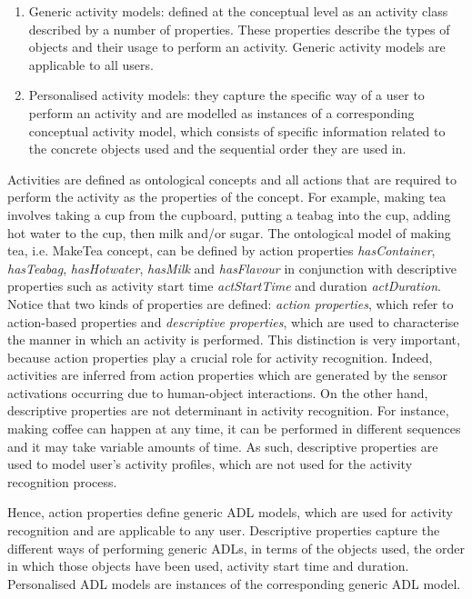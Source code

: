 \begin{enumerate}
 \item Generic activity models: defined at the conceptual level as an activity class described by a number of properties. These properties describe the types of objects and their usage to perform an activity. Generic activity models are applicable to all users.
 \item Personalised activity models: they capture the specific way of a user to perform an activity and are modelled as instances of a corresponding conceptual activity model, which consists of specific information related to the concrete objects used and the sequential order they are used in.
\end{enumerate}

Activities are defined as ontological concepts and all actions that are required to perform the activity as the properties of the concept. For example, making tea involves taking a cup from the cupboard, putting a teabag into the cup, adding hot water to the cup, then milk and/or sugar. The ontological model of making tea, i.e. MakeTea concept, can be defined by action properties \textit{hasContainer}, \textit{hasTeabag}, \textit{hasHotwater}, \textit{hasMilk} and \textit{hasFlavour} in conjunction with descriptive properties such as activity start time \textit{actStartTime} and duration \textit{actDuration}. Notice that two kinds of properties are defined: \textit{action properties}, which refer to action-based properties and \textit{descriptive properties}, which are used to characterise the manner in which an activity is performed. This distinction is very important, because action properties play a crucial role for activity recognition. Indeed, activities are inferred from action properties which are generated by the sensor activations occurring due to human-object interactions. On the other hand, descriptive properties are not determinant in activity recognition. For instance, making coffee can happen at any time, it can be performed in different sequences and it may take variable amounts of time. As such, descriptive properties are used to model user's activity profiles, which are not used for the activity recognition process.

Hence, action properties define generic ADL models, which are used for activity recognition and are applicable to any user. Descriptive properties capture the different ways of performing generic ADLs, in terms of the objects used, the order in which those objects have been used, activity start time and duration. Personalised ADL models are instances of the corresponding generic ADL model.


